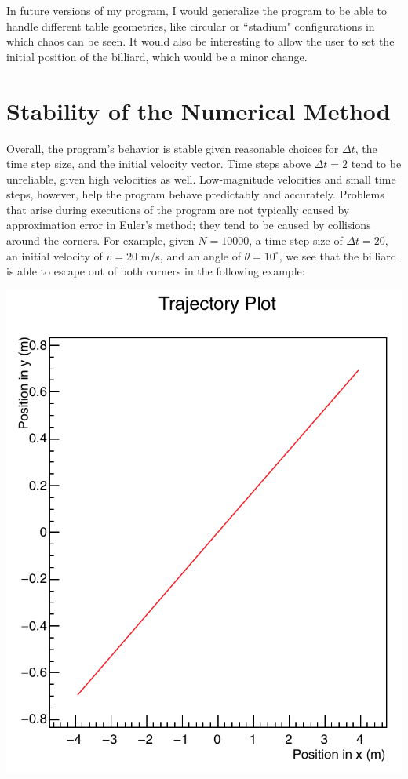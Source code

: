\documentclass[12pt]{amsart}
\begin{document}
In future versions of my program, I would generalize the program to be able to handle different table geometries, like circular or ``stadium"
configurations in which chaos can be seen. It would also be interesting to allow the user to set the initial position of the billiard, which would be a
minor change.

\section{Stability of the Numerical Method}
Overall, the program's behavior is stable given reasonable choices for $\Delta t$, the time step size, and the initial velocity vector. Time steps
above $\Delta t = 2$ tend to be unreliable, given high velocities as well. Low-magnitude velocities and small time steps, however, help the
program behave predictably and accurately. Problems that arise during executions of the program are not typically caused by approximation
error in Euler's method; they tend to be caused by collisions around the corners. For example, given $N = 10000$, a time step size of
$\Delta t = 20$, an initial velocity of $v = 20$ m/s, and an angle of $\theta = 10^{\circ}$, we see that the billiard is able to escape out of both
corners in the following example:
\begin{center}
	\includegraphics[scale=0.5]{graph3.png}
\end{center}
\end{document}
